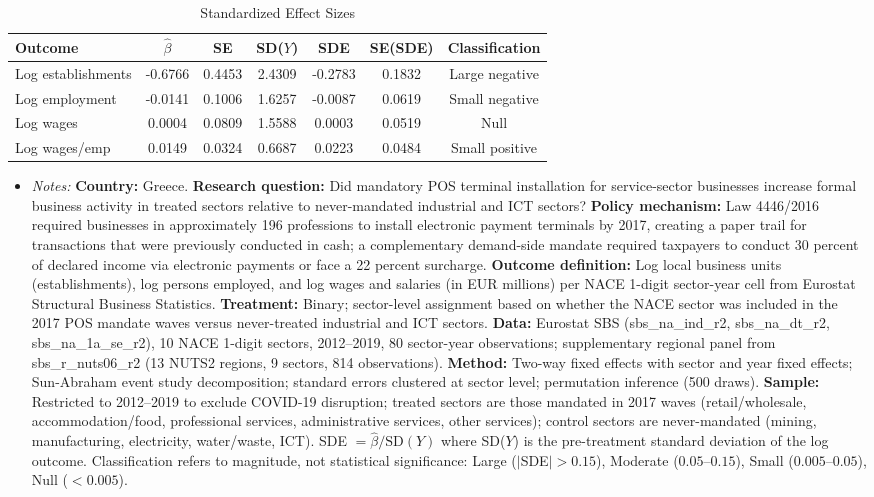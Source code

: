 \begin{table}[htbp]
\centering
\caption{Standardized Effect Sizes}
\label{tab:sde}
\begin{tabular}{lcccccc}
\toprule
Outcome & $\hat{\beta}$ & SE & SD($Y$) & SDE & SE(SDE) & Classification \\
\midrule
Log establishments & -0.6766 & 0.4453 & 2.4309 & -0.2783 & 0.1832 & Large negative \\
Log employment & -0.0141 & 0.1006 & 1.6257 & -0.0087 & 0.0619 & Small negative \\
Log wages & 0.0004 & 0.0809 & 1.5588 & 0.0003 & 0.0519 & Null \\
Log wages/emp & 0.0149 & 0.0324 & 0.6687 & 0.0223 & 0.0484 & Small positive \\
\bottomrule
\end{tabular}
\begin{itemize}[leftmargin=*,nosep]
\item \textit{Notes:} \textbf{Country:} Greece. \textbf{Research question:} Did mandatory POS terminal installation for service-sector businesses increase formal business activity in treated sectors relative to never-mandated industrial and ICT sectors? \textbf{Policy mechanism:} Law 4446/2016 required businesses in approximately 196 professions to install electronic payment terminals by 2017, creating a paper trail for transactions that were previously conducted in cash; a complementary demand-side mandate required taxpayers to conduct 30 percent of declared income via electronic payments or face a 22 percent surcharge. \textbf{Outcome definition:} Log local business units (establishments), log persons employed, and log wages and salaries (in EUR millions) per NACE 1-digit sector-year cell from Eurostat Structural Business Statistics. \textbf{Treatment:} Binary; sector-level assignment based on whether the NACE sector was included in the 2017 POS mandate waves versus never-treated industrial and ICT sectors. \textbf{Data:} Eurostat SBS (sbs\_na\_ind\_r2, sbs\_na\_dt\_r2, sbs\_na\_1a\_se\_r2), 10 NACE 1-digit sectors, 2012--2019, 80 sector-year observations; supplementary regional panel from sbs\_r\_nuts06\_r2 (13 NUTS2 regions, 9 sectors, 814 observations). \textbf{Method:} Two-way fixed effects with sector and year fixed effects; Sun-Abraham event study decomposition; standard errors clustered at sector level; permutation inference (500 draws). \textbf{Sample:} Restricted to 2012--2019 to exclude COVID-19 disruption; treated sectors are those mandated in 2017 waves (retail/wholesale, accommodation/food, professional services, administrative services, other services); control sectors are never-mandated (mining, manufacturing, electricity, water/waste, ICT). SDE $= \hat{\beta} / \text{SD}(Y)$ where SD($Y$) is the pre-treatment standard deviation of the log outcome. Classification refers to magnitude, not statistical significance: Large ($|$SDE$| > 0.15$), Moderate ($0.05$--$0.15$), Small ($0.005$--$0.05$), Null ($< 0.005$).
\end{itemize}
\end{table}
